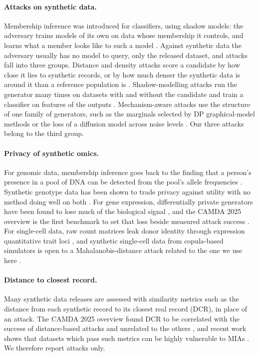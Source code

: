 \documentclass[webpdf,contemporary,large]{oup-authoring-template}
\begin{document}
\paragraph{Attacks on synthetic data.}
Membership inference was introduced for classifiers, using shadow models: the adversary trains models of its own on data whose membership it controls, and learns what a member looks like to such a model \citep{shokri_membership_2017,carlini2022membership}. Against synthetic data the adversary usually has no model to query, only the released dataset, and attacks fall into three groups. Distance and density attacks score a candidate by how close it lies to synthetic records, or by how much denser the synthetic data is around it than a reference population is \citep{chen2020gan,hilprecht2019monte,hayes2017logan,van2023membership}. Shadow-modelling attacks run the generator many times on datasets with and without the candidate and train a classifier on features of the outputs \citep{stadler2022synthetic,houssiau2022tapas,meeus2023achilles,guepin2023synthetic}. Mechanism-aware attacks use the structure of one family of generators, such as the marginals selected by DP graphical-model methods \citep{golob_privacy_2025} or the loss of a diffusion model across noise levels \citep{wu2025winning}. Our three attacks belong to the third group.

\paragraph{Privacy of synthetic omics.}
For genomic data, membership inference goes back to the finding that a person's presence in a pool of DNA can be detected from the pool's allele frequencies \citep{homer2008resolving}. Synthetic genotype data has been shown to trade privacy against utility with no method doing well on both \citep{oprisanu_utility_2022}. For gene expression, differentially private generators have been found to lose much of the biological signal \citep{chen2024biologically}, and the CAMDA 2025 overview is the first benchmark to set that loss beside measured attack success \citep{ozturk2026towards}. For single-cell data, raw count matrices leak donor identity through expression quantitative trait loci \citep{walker_private_2024}, and synthetic single-cell data from copula-based simulators is open to a Mahalanobis-distance attack related to the one we use here \citep{golob2026a}.

\paragraph{Distance to closest record.}
Many synthetic data releases are assessed with similarity metrics such as the distance from each synthetic record to its closest real record (DCR), in place of an attack. The CAMDA 2025 overview found DCR to be correlated with the success of distance-based attacks and unrelated to the others \citep{ozturk2026towards}, and recent work shows that datasets which pass such metrics can be highly vulnerable to MIAs \citep{yao2025dcr,ganev2023inadequacy}. We therefore report attacks only.
\end{document}
